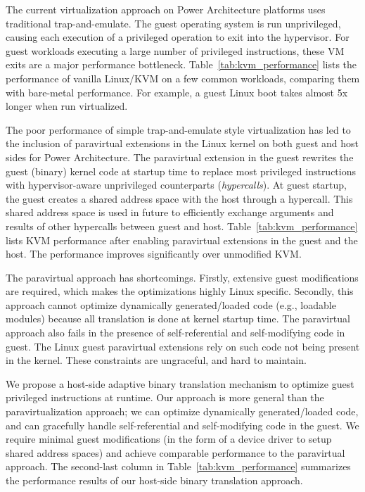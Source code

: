 \documentclass[10pt,twocolumn]{article}
\begin{document}
The current virtualization approach on Power Architecture platforms uses traditional
trap-and-emulate. The guest operating system is run unprivileged, causing each
execution of a privileged
operation to exit into the hypervisor. For guest workloads executing a large number
of privileged instructions, these VM exits are a major performance
bottleneck. Table~\ref{tab:kvm_performance} lists the performance of vanilla Linux/KVM
on a few common workloads, comparing them with bare-metal performance.
For example, a guest Linux boot takes almost 5x longer when run virtualized.

The poor performance of simple trap-and-emulate style virtualization has led to
the inclusion of paravirtual extensions in the Linux kernel on both
guest and host sides for Power Architecture\cite{pvpower}. The paravirtual extension in the guest
rewrites the guest (binary) kernel
code at startup time to replace most privileged instructions with
hypervisor-aware unprivileged counterparts ({\em hypercalls}).
At guest startup, the guest creates a shared address space with
the host through a hypercall. This shared address space
is used in future to efficiently exchange arguments and results of other hypercalls between guest and host.
Table~\ref{tab:kvm_performance} lists KVM performance after enabling paravirtual
extensions in the guest and the host. The performance improves significantly over
unmodified KVM.

The paravirtual approach has shortcomings. Firstly, extensive guest
modifications are required, which makes the optimizations highly Linux specific.
Secondly, this approach
cannot optimize dynamically generated/loaded code (e.g., loadable modules) because
all translation is done at kernel startup time.
The paravirtual approach also
fails in the presence of self-referential and self-modifying code in guest.
The Linux guest paravirtual extensions rely on such code not being present in the
kernel. These constraints are ungraceful, and hard to maintain.

We propose a host-side adaptive binary translation mechanism to optimize guest
privileged instructions at runtime. Our approach is more general than
the paravirtualization approach; we can optimize dynamically
generated/loaded code, and can gracefully handle
self-referential and self-modifying
code in the guest. We require minimal guest
modifications (in the form of a device driver to setup shared address spaces)
and achieve
comparable performance to the paravirtual approach.
The second-last column in Table~\ref{tab:kvm_performance} summarizes the performance results of
our host-side binary translation approach.
\end{document}
